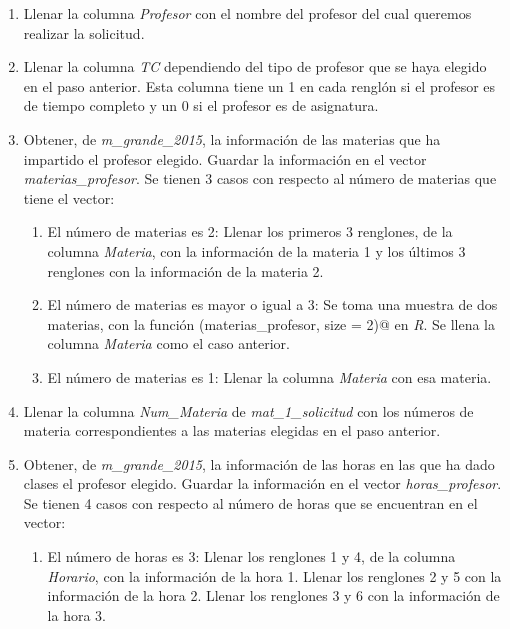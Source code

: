   \begin{enumerate}

\item Llenar la columna \textit{Profesor} con el nombre del profesor del cual queremos realizar la solicitud.

\item Llenar la columna \textit{TC} dependiendo del tipo de profesor que se haya elegido en el paso anterior. Esta columna tiene un 1 en cada renglón si el profesor es de tiempo completo y un 0 si el profesor es de asignatura.

\item Obtener, de \textit{m\_grande\_2015}, la información de las materias que ha impartido el profesor elegido. Guardar la información en el vector \textit{materias\_profesor}. Se tienen 3 casos con respecto al número de materias que tiene el vector:

\begin{enumerate}
\item El número de materias es 2: Llenar los primeros 3 renglones, de la columna \textit{Materia}, con la información de la materia 1 y los últimos 3 renglones con la información de la materia 2.

\item El número de materias es mayor o igual a 3: Se toma una muestra de dos materias, con la función \verb@sample(materias_profesor, size = 2)@ en \textit{R}. Se llena la columna \textit{Materia} como el caso anterior.

\item El número de materias es 1: Llenar la columna \textit{Materia} con esa materia.
\end{enumerate}

\item Llenar la columna \textit{Num\_Materia} de \textit{mat\_1\_solicitud} con los números de materia correspondientes a las materias elegidas en el paso anterior.

\item Obtener, de \textit{m\_grande\_2015}, la información de las horas en las que ha dado clases el profesor elegido. Guardar la información en el vector \textit{horas\_profesor}. Se tienen 4 casos con respecto al número de horas que se encuentran en el vector:

\begin{enumerate}
\item El número de horas es 3: Llenar los renglones 1 y 4, de la columna \textit{Horario}, con la información de la hora 1. Llenar los renglones 2 y 5 con la información de la hora 2. Llenar los renglones 3 y 6 con la información de la hora 3.


\end{enumerate}
\end{enumerate}

